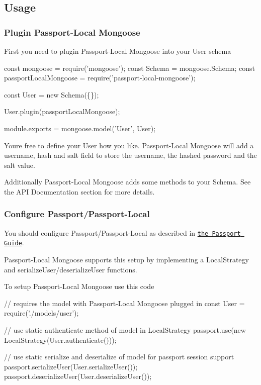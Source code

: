 \subsection*{Usage}

\subsubsection*{Plugin Passport-\/\+Local Mongoose}

First you need to plugin Passport-\/\+Local Mongoose into your User schema


\begin{DoxyCode}
const mongoose = require('mongoose');
const Schema = mongoose.Schema;
const passportLocalMongoose = require('passport-local-mongoose');

const User = new Schema(\{\});

User.plugin(passportLocalMongoose);

module.exports = mongoose.model('User', User);
\end{DoxyCode}


You\textquotesingle{}re free to define your User how you like. Passport-\/\+Local Mongoose will add a username, hash and salt field to store the username, the hashed password and the salt value.

Additionally Passport-\/\+Local Mongoose adds some methods to your Schema. See the A\+PI Documentation section for more details.

\subsubsection*{Configure Passport/\+Passport-\/\+Local}

You should configure Passport/\+Passport-\/\+Local as described in \href{http://passportjs.org/guide/configure/}{\tt the Passport Guide}.

Passport-\/\+Local Mongoose supports this setup by implementing a {\ttfamily Local\+Strategy} and serialize\+User/deserialize\+User functions.

To setup Passport-\/\+Local Mongoose use this code


\begin{DoxyCode}
// requires the model with Passport-Local Mongoose plugged in
const User = require('./models/user');

// use static authenticate method of model in LocalStrategy
passport.use(new LocalStrategy(User.authenticate()));

// use static serialize and deserialize of model for passport session support
passport.serializeUser(User.serializeUser());
passport.deserializeUser(User.deserializeUser());
\end{DoxyCode}


